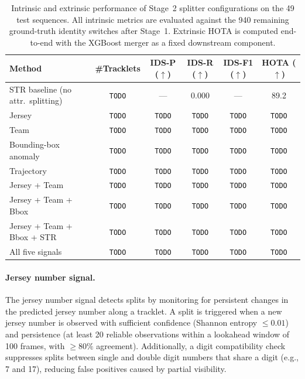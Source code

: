 \begin{table}[H]
\centering
\begin{tabular}{lccccc}
\toprule
\textbf{Method} & \textbf{\#Tracklets} & \textbf{IDS-P} ($\uparrow$) & \textbf{IDS-R} ($\uparrow$) & \textbf{IDS-F1} ($\uparrow$) & \textbf{HOTA} ($\uparrow$) \\
\midrule
STR baseline (no attr.\ splitting) & \texttt{TODO} & --- & 0.000 & --- & 89.2 \\
\midrule
Jersey                      & \texttt{TODO} & \texttt{TODO} & \texttt{TODO} & \texttt{TODO} & \texttt{TODO} \\
Team                        & \texttt{TODO} & \texttt{TODO} & \texttt{TODO} & \texttt{TODO} & \texttt{TODO} \\
Bounding-box anomaly        & \texttt{TODO} & \texttt{TODO} & \texttt{TODO} & \texttt{TODO} & \texttt{TODO} \\
Trajectory                  & \texttt{TODO} & \texttt{TODO} & \texttt{TODO} & \texttt{TODO} & \texttt{TODO} \\
\midrule
Jersey + Team               & \texttt{TODO} & \texttt{TODO} & \texttt{TODO} & \texttt{TODO} & \texttt{TODO} \\
Jersey + Team + Bbox        & \texttt{TODO} & \texttt{TODO} & \texttt{TODO} & \texttt{TODO} & \texttt{TODO} \\
Jersey + Team + Bbox + STR  & \texttt{TODO} & \texttt{TODO} & \texttt{TODO} & \texttt{TODO} & \texttt{TODO} \\
All five signals            & \texttt{TODO} & \texttt{TODO} & \texttt{TODO} & \texttt{TODO} & \texttt{TODO} \\
\bottomrule
\end{tabular}
\caption{Intrinsic and extrinsic performance of Stage~2 splitter configurations on the 49 test sequences. All intrinsic metrics are evaluated against the 940 remaining ground-truth identity switches after Stage~1. Extrinsic HOTA is computed end-to-end with the XGBoost merger as a fixed downstream component.}
\label{tab:splitter_comparison}
\end{table}

\paragraph{Jersey number signal.}
The jersey number signal detects splits by monitoring for persistent changes in the predicted jersey number along a tracklet. A split is triggered when a new jersey number is observed with sufficient confidence (Shannon entropy $\leq 0.01$) and persistence (at least 20 reliable observations within a lookahead window of 100 frames, with $\geq 80\%$ agreement). Additionally, a digit compatibility check suppresses splits between single and double digit numbers that share a digit (e.g., 7 and 17), reducing false positives caused by partial visibility.

